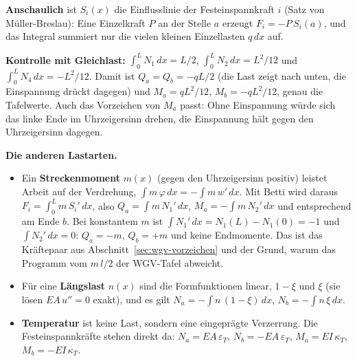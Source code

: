 \textbf{Anschaulich} ist $S_i(x)$ die Einflusslinie der Festeinspannkraft $i$ (Satz von
Müller-Breslau): Eine Einzelkraft $P$ an der Stelle $a$ erzeugt $F_i = -P\,S_i(a)$, und das Integral
summiert nur die vielen kleinen Einzellasten $q\,dx$ auf.

\textbf{Kontrolle mit Gleichlast:} $\int_0^L N_1\,dx = L/2$, $\int_0^L N_2\,dx = L^2/12$ und
$\int_0^L N_4\,dx = -L^2/12$. Damit ist $Q_a = Q_b = -qL/2$ (die Last zeigt nach unten, die
Einspannung drückt dagegen) und $M_a = qL^2/12$, $M_b = -qL^2/12$, genau die Tafelwerte. Auch das
Vorzeichen von $M_a$ passt: Ohne Einspannung würde sich das linke Ende im Uhrzeigersinn drehen, die
Einspannung hält gegen den Uhrzeigersinn dagegen.

\textbf{Die anderen Lastarten.}
\begin{itemize}
  \item Ein \textbf{Streckenmoment} $m(x)$ (gegen den Uhrzeigersinn positiv) leistet Arbeit auf der
        Verdrehung, $\int m\,\varphi\,dx = -\int m\,w'\,dx$. Mit Betti wird daraus
        $F_i = \int_0^L m\,S_i'\,dx$, also $Q_a = \int m\,N_1'\,dx$, $M_a = -\int m\,N_2'\,dx$ und
        entsprechend am Ende $b$. Bei konstantem $m$ ist $\int N_1'\,dx = N_1(L) - N_1(0) = -1$ und
        $\int N_2'\,dx = 0$: $Q_a = -m$, $Q_b = +m$ und keine Endmomente. Das ist das Kräftepaar aus
        Abschnitt~\ref{sec:wgv-vorzeichen} und der Grund, warum das Programm vom $m\,l/2$ der
        WGV-Tafel abweicht.
  \item Für eine \textbf{Längslast} $n(x)$ sind die Formfunktionen linear, $1 - \xi$ und $\xi$ (sie
        lösen $EA\,u'' = 0$ exakt), und es gilt $N_a = -\int n\,(1-\xi)\,dx$, $N_b = -\int n\,\xi\,dx$.
  \item \textbf{Temperatur} ist keine Last, sondern eine eingeprägte Verzerrung. Die
        Festeinspannkräfte stehen direkt da: $N_a = EA\,\varepsilon_T$, $N_b = -EA\,\varepsilon_T$,
        $M_a = EI\,\kappa_T$, $M_b = -EI\,\kappa_T$.
\end{itemize}

